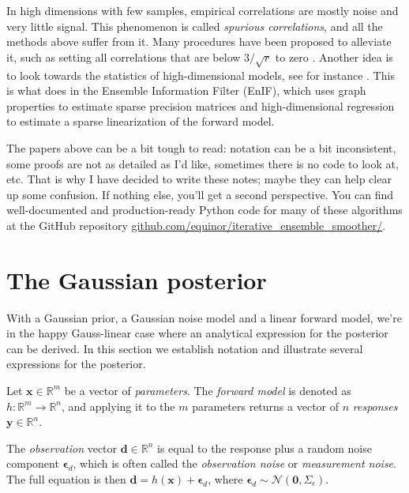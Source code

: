 \documentclass[12pt, a4paper]{article}
\theoremstyle{spaced}
\theoremstyle{spaceddef}
\numberwithin{equation}{section}
\newcommand{\R}{\mathbb{R}}
\begin{document}
In high dimensions with few samples, empirical correlations are mostly noise and very little signal.
This phenomenon is called \emph{spurious correlations}, and all the methods above suffer from it.
Many procedures have been proposed to alleviate it, such as setting all correlations that are below $3 / \sqrt{r}$ to zero \citep{vossepoel2025adaptive}.
Another idea is to look towards the statistics of high-dimensional models, see for instance \citet[Chapter~18]{hastie2009elements}.
This is what \citet{lunde2025ensemble} does in the Ensemble Information Filter (EnIF), which uses graph properties to estimate sparse precision matrices and high-dimensional regression to estimate a sparse linearization of the forward model.

The papers above can be a bit tough to read:
notation can be a bit inconsistent, some proofs are not as detailed as I'd like, sometimes there is no code to look at, etc.
That is why I have decided to write these notes; maybe they can help clear up some confusion.
If nothing else, you'll get a second perspective.
You can find well-documented and production-ready Python code for many of these algorithms at the GitHub repository  \href{https://github.com/equinor/iterative_ensemble_smoother/}{github.com/equinor/iterative\_ensemble\_smoother/}.

\section{The Gaussian posterior}

With a Gaussian prior, a Gaussian noise model and a linear forward model, we're in the happy Gauss-linear case where an analytical expression for the posterior can be derived.
In this section we establish notation and illustrate several expressions for the posterior.


Let $\bm{x} \in \R^m$ be a vector of \emph{parameters}.
The \emph{forward model} is denoted as $h: \R^m \to \R^n$, and applying it to the $m$ parameters returns a vector of $n$ \emph{responses} $\bm{y} \in \R^n$.

The \emph{observation} vector $\bm{d} \in \R^n$ is equal to the response plus a random noise component $\bm{\epsilon}_d$, which is often called the \emph{observation noise} or \emph{measurement noise}.
The full equation is then $\bm{d} = h(\bm{x}) + \bm{\epsilon}_d$,
where $\bm{\epsilon}_d \sim \mathcal{N}(\bm{0}, \Sigma_{\epsilon})$.
\end{document}
